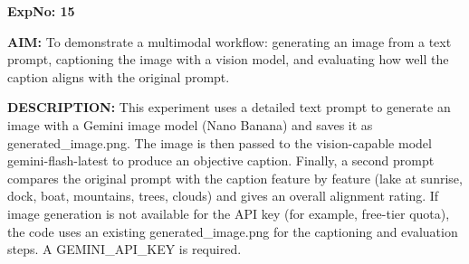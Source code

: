 \documentclass[10pt,a4paper]{article}
\newcommand{\code}[1]{{\ttfamily\hyphenchar\font=-1 #1}}
\begin{document}
\clearpage

\noindent\textbf{ExpNo: 15}

\noindent\textbf{AIM:} To demonstrate a multimodal workflow: generating an image from a text prompt, captioning the image with a vision model, and evaluating how well the caption aligns with the original prompt.

\noindent\textbf{DESCRIPTION:} This experiment uses a detailed text prompt to generate an image with a Gemini image model (Nano Banana) and saves it as \code{generated\_\allowbreak{}image.png}. The image is then passed to the vision-capable model \code{gemini{-}\allowbreak{}flash{-}\allowbreak{}latest} to produce an objective caption. Finally, a second prompt compares the original prompt with the caption feature by feature (lake at sunrise, dock, boat, mountains, trees, clouds) and gives an overall alignment rating. If image generation is not available for the API key (for example, free-tier quota), the code uses an existing \code{generated\_\allowbreak{}image.png} for the captioning and evaluation steps. A \code{GEMINI\_\allowbreak{}API\_\allowbreak{}KEY} is required.
\end{document}
